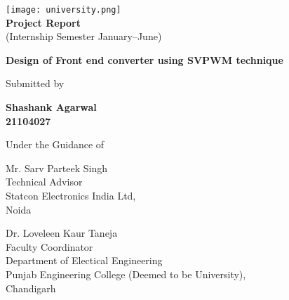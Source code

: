 \begin{titlepage}
    \begin{center}
        \texttt{[image: university.png]}\\
        {\textbf{Project Report}}\\
        \vspace*{0.2cm}
        (Internship Semester January--June)

        \vspace*{3cm}
        {\Large\textbf {Design of Front end converter using SVPWM technique}}

        \vfill
        Submitted by

        \vfill
        \textbf{
        Shashank Agarwal\\
        21104027
        }

        \vfill
        Under the Guidance of
    \end{center}
    \vfill

    \noindent
    
    \begin{minipage}[t]{0.5\textwidth}
        \raggedright
        Mr. Sarv Parteek Singh\\
        Technical Advisor\\
        Statcon Electronics India Ltd,\\
        Noida
    \end{minipage}
    \hfill
    \begin{minipage}[t]{0.5\textwidth}
        \raggedleft
        Dr. Loveleen Kaur Taneja\\
        Faculty Coordinator\\
        Department of Electical Engineering\\
        Punjab Engineering College (Deemed to be University),\\
        Chandigarh
    \end{minipage}
\end{titlepage}